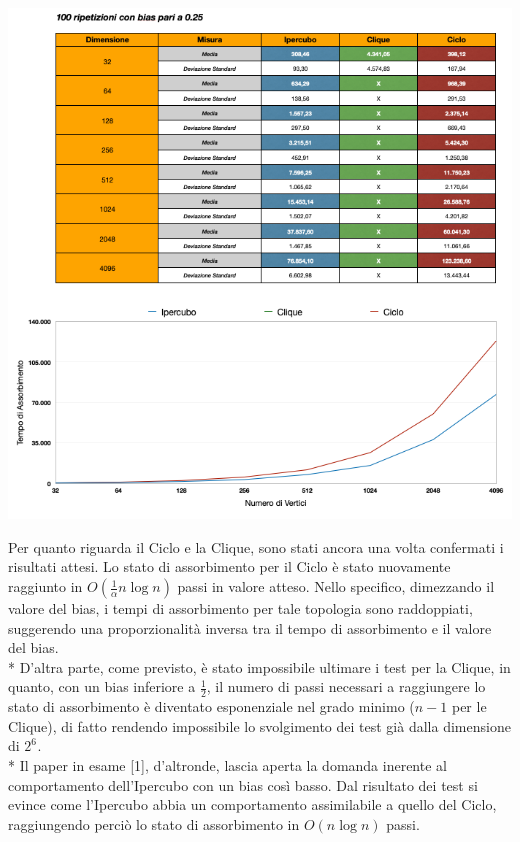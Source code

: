 \documentclass{article}
\begin{document}
\begin{center}
\includegraphics[width=1\textwidth]{Test/test_bias025.png}
\end{center}
Per quanto riguarda il Ciclo e la Clique, sono stati ancora una volta confermati i risultati attesi.
Lo stato di assorbimento per il Ciclo è stato nuovamente raggiunto in $O(\frac{1}{\alpha}n\log{}n)$ passi in valore atteso. Nello specifico, dimezzando il valore del bias, i tempi di assorbimento per tale topologia sono raddoppiati, suggerendo una proporzionalità inversa tra il tempo di assorbimento e il valore del bias.\\*
D'altra parte, come previsto, è stato impossibile ultimare i test per la Clique, in quanto, con un bias inferiore a $\frac{1}{2}$, il numero di passi necessari a raggiungere lo stato di assorbimento è diventato esponenziale nel grado minimo ($n-1$ per le Clique), di fatto rendendo impossibile lo svolgimento dei test già dalla dimensione di $2^{6^{\mathrm{}}}$.\\*
Il paper in esame [1], d'altronde, lascia aperta la domanda inerente al comportamento dell'Ipercubo con un bias così basso. Dal risultato dei test si evince come l'Ipercubo abbia un comportamento assimilabile a quello del Ciclo, raggiungendo perciò lo stato di assorbimento in $O(n\log{}n)$ passi.
\end{document}
